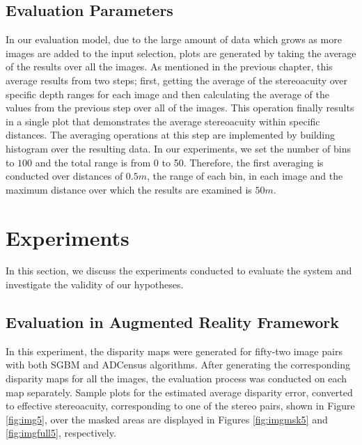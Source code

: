 \subsection{Evaluation Parameters}
In our evaluation model, due to the large amount of data which grows as more images are added to the input selection, 
plots are generated by taking the average of the results over all the images. As mentioned in the previous chapter, this average results from two steps; 
first, getting the average of the stereoacuity over specific
depth ranges for each image and then calculating the average of the values from the previous step over all of the images. This operation finally results in a single plot
that demonstrates the average stereoacuity within specific distances.
The averaging operations at this step are implemented by building histogram over the resulting data. 
In our experiments, we set the number of bins to $100$ and the total range is from 0 to 50. Therefore, the first averaging is conducted over distances of $0.5m$, the range
of each bin, in each image and the maximum distance over which the results are 
examined is $50m$.


\section{Experiments}
In this section, we discuss the experiments conducted to evaluate the system and investigate the validity of our hypotheses.

\subsection{Evaluation in Augmented Reality Framework}

In this experiment, the disparity maps 
were generated for fifty-two image pairs with both SGBM and ADCensus algorithms. 
After generating the corresponding disparity maps for all the images, 
the evaluation process was conducted on each map separately.\newline
Sample plots for the estimated average disparity error, converted to effective stereoacuity, corresponding to one of the stereo pairs, shown in Figure \ref{fig:img5},
over the masked areas are displayed in Figures \ref{fig:imgmsk5} and \ref{fig:imgfull5}, respectively.

